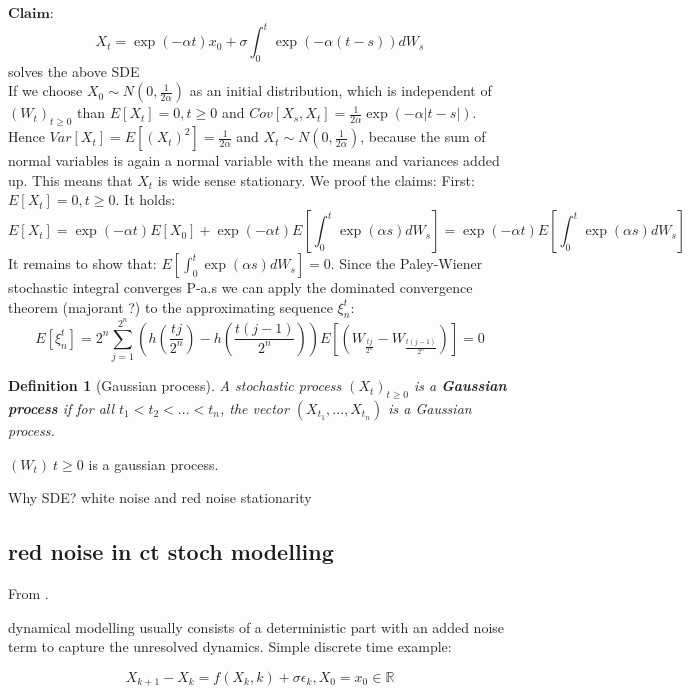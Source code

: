 \documentclass[%
thesis=student,%
coverpage=false,%
titlepage=false,%
headmarks=true, %
german,%
font=libertine, %
math=newpxtx, %
BCOR=5mm,%
coverBCOR=11mm%
]{tumbook}
\newtheorem{definition}{Definition}[section]
\begin{document}
$\textbf{Claim}$: 
\[
X_{t} = \exp(-\alpha t)x_{0} + \sigma\int_{0}^{t}\exp(-\alpha (t-s))dW_{s}
\]
solves the above SDE \\

If we choose $X_{0} \sim N(0,\frac{1}{2\alpha})$ as an initial distribution, which is independent of $(W_{t})_{t\geq 0}$ than $E[X_{t}] = 0, t \geq 0$ and $Cov[X_{s},X_{t}] = \frac{1}{2\alpha}\exp(-\alpha\lvert t-s \rvert)$. Hence $Var[X_{t}]=E[(X_{t})^{2}]=\frac{1}{2\alpha}$ and $X_{t} \sim N(0,\frac{1}{2\alpha})$, because the sum of normal variables is again a normal variable with the means and variances added up. This means that $X_{t}$ is wide sense stationary. We proof the claims:
First: $E[X_{t}] = 0, t \geq 0$. It holds: 
\[
E[X_{t}] = \exp(-\alpha t)E[X_{0}] + \exp(-\alpha t)E[\int_{0}^{t} \exp(\alpha s) dW_{s}] = \exp(-\alpha t)E[\int_{0}^{t} \exp(\alpha s) dW_{s}]
\]
It remains to show that: $E[\int_{0}^{t} \exp(\alpha s) dW_{s}] = 0$.
Since the Paley-Wiener stochastic integral converges P-a.s we can apply the dominated convergence theorem (majorant ?) to the approximating sequence $\xi_{n}^{t}$: 
\[
E[\xi_{n}^{t}] = 2^{n}\sum_{j=1}^{2^{n}}(h(\frac{tj}{2^{n}})-h(\frac{t(j-1)}{2^{n}}))E[(W_{\frac{tj}{2^{n}}}-W_{\frac{t(j-1)}{2^{n}}})] = 0 
\]





\begin{definition}[Gaussian process]
    A stochastic process $(X_{t})_{t\geq 0}$ is a \textbf{Gaussian process} if for all $t_{1} < t_{2} < ... < t_{n}$, the vector $(X_{t_{1}},...,X_{t_{n}})$ is a Gaussian process.
\end{definition}

$(W_{t}) \ t \geq 0$ is a gaussian process.



Why SDE?
white noise and red noise
stationarity

\subsection{red noise in ct stoch modelling}
From \cite{Morr:2022}.

dynamical modelling usually consists of a deterministic part with an added noise term to capture the unresolved dynamics. Simple discrete time example:

\begin{equation}
    X_{k+1}-X_{k} = f(X_{k},k) + \sigma\epsilon_{k}, X_{0} = x_{0} \in \mathbb{R}
\end{equation}
\end{document}
